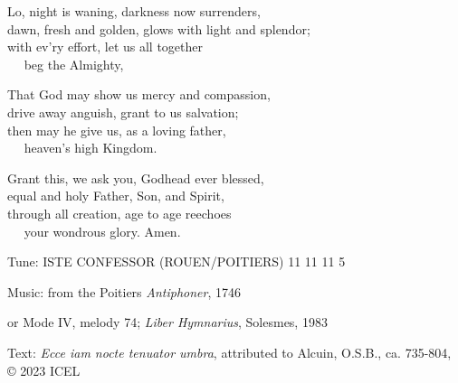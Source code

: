 \hymn

\begin{hymnverse}
Lo, night is waning, darkness now surrenders,\\
dawn, fresh and golden, glows with light and splendor;\\
with ev’ry effort, let us all together\\
   beg the Almighty,

That God may show us mercy and compassion,\\
drive away anguish, grant to us salvation;\\
then may he give us, as a loving father,\\
   heaven’s high Kingdom.

Grant this, we ask you, Godhead ever blessed,\\
equal and holy Father, Son, and Spirit,\\
through all creation, age to age reechoes\\
   your wondrous glory. Amen.
\end{hymnverse}

\begin{hymnsource}
Tune: ISTE CONFESSOR (ROUEN/POITIERS) 11 11 11 5

Music: from the Poitiers \emph{Antiphoner}, 1746

or Mode IV, melody 74; \emph{Liber Hymnarius}, Solesmes, 1983

Text: \emph{Ecce iam nocte tenuator umbra}, attributed to Alcuin, O.S.B., ca. 735-804, © 2023 ICEL
\end{hymnsource}